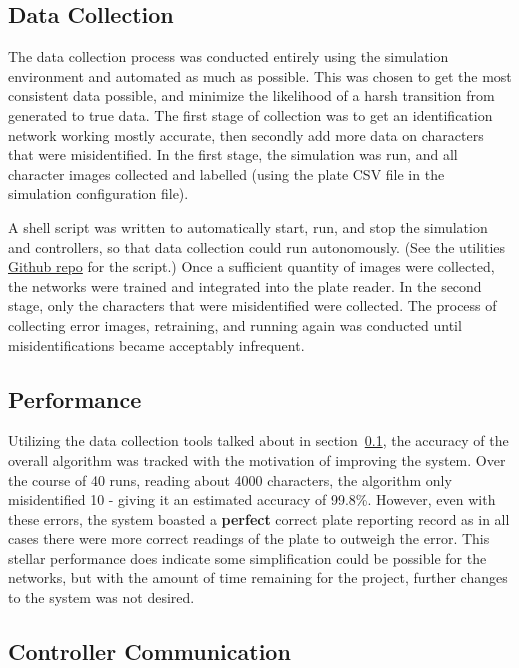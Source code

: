 \documentclass[titlepage, twocolumn]{article}
\begin{document}
\subsection{Data Collection} \label{platedata}

The data collection process was conducted entirely using the simulation environment and automated as much as possible. This was chosen to get the most consistent data possible, and minimize the likelihood of a harsh transition from generated to true data. The first stage of collection was to get an identification network working mostly accurate, then secondly add more data on characters that were misidentified. In the first stage, the simulation was run, and all character images collected and labelled (using the plate CSV file in the simulation configuration file). 

A shell script was written to automatically start, run, and stop the simulation and controllers, so that data collection could run autonomously. (See the utilities \href{https://github.com/nvanrumpt/robot_controller_utils2/blob/master/scripts/repeat_runsim.sh}{Github repo} for the script.) Once a sufficient quantity of images were collected, the networks were trained and integrated into the plate reader. In the second stage, only the characters that were misidentified were collected. The process of collecting error images, retraining, and running again was conducted until misidentifications became acceptably infrequent.

\subsection{Performance}

Utilizing the data collection tools talked about in section~\ref{platedata}, the accuracy of the overall algorithm was tracked with the motivation of improving the system. Over the course of 40 runs, reading about 4000 characters, the algorithm only misidentified 10 - giving it an estimated accuracy of 99.8\%. However, even with these errors, the system boasted a {\bf perfect} correct plate reporting record as in all cases there were more correct readings of the plate to outweigh the error. This stellar performance does indicate some simplification could be possible for the networks, but with the amount of time remaining for the project, further changes to the system was not desired.

\subsection{Controller Communication}
\end{document}
